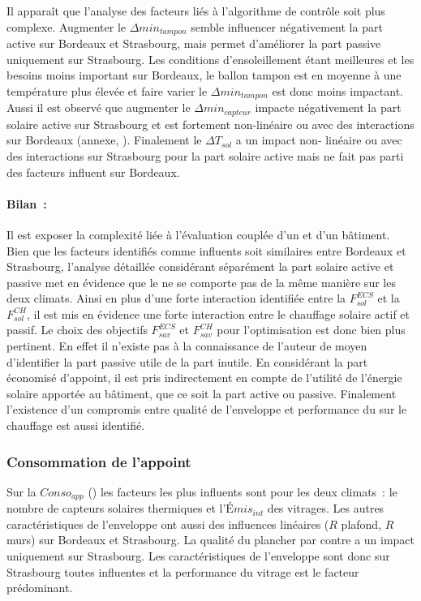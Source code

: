 Il apparaît que l’analyse des facteurs liés à l’algorithme de contrôle soit plus complexe.
Augmenter le $\Delta min_{tampon}$ semble influencer négativement la part active sur
Bordeaux et Strasbourg, mais permet d’améliorer la part passive uniquement sur
Strasbourg. Les conditions d’ensoleillement étant meilleures et les besoins moins
important sur Bordeaux, le ballon tampon est en moyenne à une température plus élevée et
faire varier le $\Delta min_{tampon}$ est donc moins impactant. Aussi il est observé que
augmenter le $\Delta min_{capteur}$ impacte négativement la part solaire active sur
Strasbourg et est fortement non-linéaire ou avec des interactions sur Bordeaux (annexe,
). Finalement le $\Delta T_{sol}$ a un impact non-
linéaire ou avec des interactions sur Strasbourg pour la part solaire active mais ne fait
pas parti des facteurs influent sur Bordeaux.

\paragraph{Bilan~:} %
\label{par:bilan_prod_sol_chauff}
Il est exposer la complexité liée à l’évaluation couplée d’un  et d’un bâtiment.
Bien que les facteurs identifiés comme influents soit similaires entre Bordeaux et
Strasbourg, l’analyse détaillée considérant séparément la part solaire active et passive
met en évidence que le  ne se comporte pas de la même manière sur les deux
climats. Ainsi en plus d’une forte interaction identifiée entre la $F_{sol}^{ECS}$ et la
$F_{sol}^{CH}$, il est mis en évidence une forte interaction entre le chauffage solaire
actif et passif. Le choix des objectifs $F_{sav}^{ECS}$ et $F_{sav}^{CH}$ pour
l’optimisation est donc bien plus pertinent. En effet il n’existe pas à la connaissance de
l’auteur de moyen d’identifier la part passive utile de la part inutile. En considérant la
part économisé d’appoint, il est pris indirectement en compte de l’utilité de l’énergie
solaire apportée au bâtiment, que ce soit la part active ou passive. Finalement
l’existence d’un compromis entre qualité de l’enveloppe et performance du  sur le
chauffage est aussi identifié.


\subsubsection{Consommation de l’appoint} %
\label{ssub:consommation_de_l_appoint}
Sur la $Conso_{app}$ () les facteurs les plus influents sont
pour les deux climats~: le nombre de capteurs solaires thermiques et l’$Émis_{int}$ des
vitrages. Les autres caractéristiques de l’enveloppe ont aussi des influences linéaires
($R$ plafond, $R$ murs) sur Bordeaux et Strasbourg. La qualité du plancher par contre a un
impact uniquement sur Strasbourg. Les caractéristiques de l’enveloppe sont donc sur
Strasbourg toutes influentes et la performance du vitrage est le facteur prédominant.

